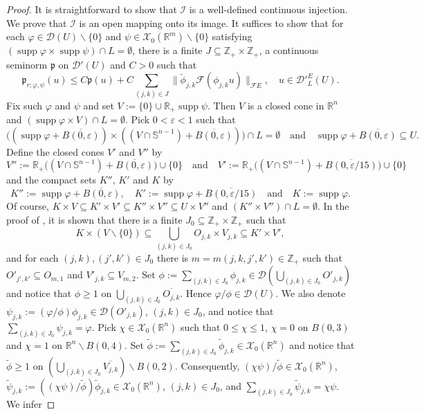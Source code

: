 \documentclass[12pt,reqno]{amsart}
\newcommand{\RR}{\mathbb R}
\newcommand{\ZZ}{\mathbb Z}
\newcommand{\DD}{\mathcal D}
\newcommand{\XX}{\mathcal X}
\newcommand{\supp}{\operatorname{supp}}
\theoremstyle{plain}
\theoremstyle{remark}
\theoremstyle{definition}
\numberwithin{equation}{section}
\begin{document}
\begin{proof}
It is straightforward to show that $\mathcal{I}$ is a well-defined continuous injection. We prove that $\mathcal{I}$ is an open mapping onto its image. It suffices to show that for each $\varphi\in\DD(U)\backslash\{0\}$ and $\psi\in\XX_0(\RR^m)\backslash\{0\}$ satisfying $(\supp \varphi \times\supp\psi)\cap L=\emptyset$, there is a finite $J\subseteq \ZZ_+\times \ZZ_+$, a continuous seminorm $\mathfrak{p}$ on $\DD'(U)$ and $C>0$ such that
\begin{equation}\label{ine-sem-for-openmap111}
\mathfrak{p}_{r;\varphi,\psi}(u)\leq C\mathfrak{p}(u)+C\sum_{(j,k)\in J}\|\widetilde{\phi}_{j,k}\mathcal{F}(\phi_{j,k} u)\|_{\mathcal{F}E},\quad u\in\DD'^E_L(U).
\end{equation}
Fix such $\varphi$ and $\psi$ and set $V:=\{0\}\cup\RR_+ \supp\psi$. Then $V$ is a closed cone in $\RR^n$ and $(\supp\varphi\times V)\cap L=\emptyset$. Pick $0<\varepsilon<1$ such that
$$
\big((\supp\varphi+\overline{B(0,\varepsilon)})\times ((V\cap \mathbb{S}^{n-1})+\overline{B(0,\varepsilon)})\big)\cap L=\emptyset\quad \mbox{and}\quad \supp\varphi+\overline{B(0,\varepsilon)}\subseteq U.
$$
Define the closed cones $V'$ and $V''$ by
$$
V'':=\RR_+\big((V\cap \mathbb{S}^{n-1})+\overline{B(0,\varepsilon)}\big)\cup\{0\}\quad \mbox{and}\quad V':=\RR_+\big((V\cap \mathbb{S}^{n-1})+\overline{B(0,\varepsilon/15)}\big)\cup\{0\}
$$
and the compact sets $K''$, $K'$ and $K$ by
$$
K'':=\supp\varphi+\overline{B(0,\varepsilon)},\quad K':=\supp\varphi+\overline{B(0,\varepsilon/15)}\quad \mbox{and}\quad K:=\supp\varphi.
$$
Of course, $K\times V\subseteq K'\times V'\subseteq K''\times V''\subseteq U\times V''$ and $(K''\times V'')\cap L=\emptyset$. In the proof of \cite[Proposition 3.7]{PP}, it is shown that there is a finite $J_0\subseteq \ZZ_+\times\ZZ_+$ such that
$$
K\times (V\backslash\{0\})\subseteq \bigcup_{(j,k)\in J_0} O_{j,k}\times V_{j,k}\subseteq K'\times V',
$$
and for each $(j,k), (j',k')\in J_0$ there is $m=m(j,k,j',k')\in\ZZ_+$ such that $O'_{j',k'}\subseteq O_{m,1}$ and $V'_{j,k}\subseteq V_{m,2}$. Set $\phi:=\sum_{(j,k)\in J_0}\phi_{j,k}\in \DD(\bigcup_{(j,k)\in J_0} O'_{j,k})$ and notice that $\phi\geq 1$ on $\bigcup_{(j,k)\in J_0}\overline{O_{j,k}}$. Hence $\varphi/\phi\in \DD(U)$. We also denote $\psi_{j,k}:=(\varphi/\phi)\phi_{j,k}\in \DD(O'_{j,k})$, $(j,k)\in J_0$, and notice that $\sum_{(j,k)\in J_0}\psi_{j,k}=\varphi$. Pick $\chi\in\XX_0(\RR^n)$ such that $0\leq \chi\leq 1$, $\chi=0$ on $B(0,3)$ and $\chi=1$ on $\RR^n\backslash B(0,4)$. Set $\widetilde{\phi}:=\sum_{(j,k)\in J_0}\widetilde{\phi}_{j,k}\in \XX_0(\RR^n)$ and notice that $\widetilde{\phi}\geq 1$ on $(\bigcup_{(j,k)\in J_0}\overline{V_{j,k}})\backslash B(0,2)$. Consequently, $(\chi\psi)/\widetilde{\phi}\in \XX_0(\RR^n)$, $\widetilde{\psi}_{j,k}:=((\chi\psi)/\widetilde{\phi})\widetilde{\phi}_{j,k}\in \XX_0(\RR^n)$, $(j,k)\in J_0$, and $\sum_{(j,k)\in J_0}\widetilde{\psi}_{j,k}=\chi\psi$. We infer

\end{proof}
\end{document}
